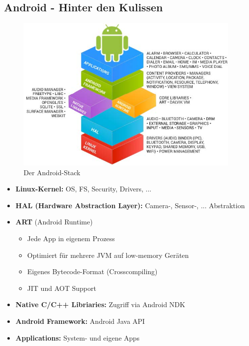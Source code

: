 \documentclass[a4paper]{article}
\begin{document}
\subsection{Android - Hinter den Kulissen}
\begin{figure}[h!]
	\centering
	\includegraphics[width=11cm]{img/androidstack.jpg}
	\caption{Der Android-Stack}
	\label{fig:androstack}
\end{figure}
\begin{itemize}
	\item \textbf{Linux-Kernel:} OS, FS, Security, Drivers, ...
	\item \textbf{HAL (Hardware Abstraction Layer):} Camera-, Sensor-, ... Abstraktion
	\item \textbf{ART} (Android Runtime)
	\begin{itemize}
		\item Jede App in eigenem Prozess
		\item Optimiert für mehrere JVM auf low-memory Geräten
		\item Eigenes Bytecode-Format (Crosscompiling)
		\item JIT und AOT Support
	\end{itemize}
	\item \textbf{Native C/C++ Libriaries:} Zugriff via Android NDK
	\item \textbf{Android Framework:} Android Java API
	\item \textbf{Applications:} System- und eigene Apps
\end{itemize}
\newpage
\end{document}
